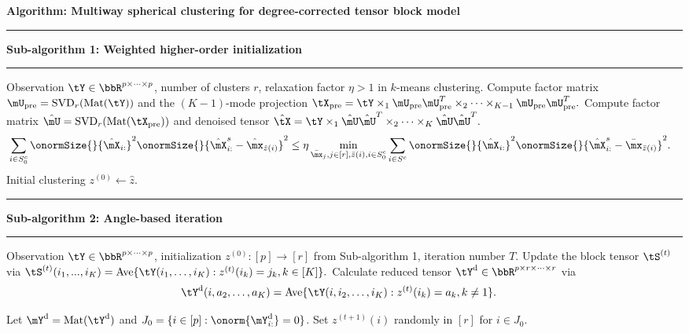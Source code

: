 \documentclass[lettersize,onecolumn,journal]{IEEEtran}
\theoremstyle{definition}
\theoremstyle{definition}
\newcommand\Algphase[1]{%
\vspace*{-.7\baselineskip}\Statex\hspace*{\dimexpr-\algorithmicindent-2pt\relax}\rule{\columnwidth}{0.4pt}%
\Statex\hspace*{-\algorithmicindent}\textbf{#1}%
\vspace*{-.7\baselineskip}\Statex\hspace*{\dimexpr-\algorithmicindent-2pt\relax}\rule{\columnwidth}{0.4pt}%
}
\begin{document}
\begin{algorithm}[h!]
\caption*{\bf Algorithm: Multiway spherical clustering for degree-corrected tensor block model }
\vspace{.15cm}
\begin{algorithmic}[1]
\Algphase{Sub-algorithm 1: Weighted higher-order initialization}
\INPUT Observation $\tY \in \bbR^{p\times \cdots \times p}$, number of clusters $r$, relaxation factor $\eta > 1$ in $k$-means clustering.
\State Compute factor matrix $ \mU_{\text{pre}} = \text{SVD}_{r} (\text{Mat}(\tY))$ and the $(K-1)$-mode projection $
\tX_{\text{pre}} = \tY \times_1   \mU_{\text{pre}} \mU_{\text{pre}}^T \times_2 \cdots \times_{K-1}  \mU_{\text{pre}} \mU_{\text{pre}}^T.$
\State Compute factor matrix $\hat \mU = \text{SVD}_{r}(\text{Mat}(\tX_{\text{pre}}))$ and denoised tensor
$\hat \tX = \tY \times_1 \hat \mU \hat \mU^T \times_2 \cdots \times_K \hat \mU \hat \mU^T.$
\begin{align}
    &\sum_{i \in S_0^c }  \onormSize{}{\hat \mX_{i:}}^2 \onormSize{}{\hat \mX_{i:}^s - \hat \mx_{\hat z(i)} }^2 
    \leq 
    \eta \min_{\substack{\bar \mx_j, j\in[r], \bar z(i),i\in S_0^{c}}} \sum_{i \in S^c } \onormSize{}{\hat \mX_{i:}}^2 \onormSize{}{ \hat \mX_{i:}^s -   \bar \mx_{\bar z(i)}}^2.
\end{align}
\OUTPUT Initial clustering $z^{(0)} \leftarrow \hat z$.

\Algphase{Sub-algorithm 2: Angle-based iteration}
\INPUT Observation $\tY \in \bbR^{p \times \cdots \times p}$, initialization $z^{(0)} \colon [p]\to[r]$ from Sub-algorithm 1, iteration number $T$.
\State Update the block tensor $\tS^{(t)}$ via
$\tS^{(t)} (i_1,...,i_K)= \text{Ave} \{\tY(i_1,\ldots,i_K): z^{(t)}(i_k) = j_k, k \in [K]\}.$
\State Calculate reduced tensor $\tY^{\text{d}} \in \bbR^{p \times r \times \cdots \times r}$ via
\begin{align}
    &\tY^{\text{d}}(i,a_2,\ldots,a_K) 
    = 
\text{Ave}\{\tY(i,i_2,\ldots,i_K): z^{(t)}(i_k) = a_k, k \neq 1 \}.
\end{align}

\State Let $\mY^{\text{d}} = \text{Mat}(\tY^{\text{d}})$ and $J_0 = \{ i\in[p]: \onorm{\mY^{\text{d}}_{i:}} = 0\}$. Set $z^{(t+1)}(i)$ randomly in $[r]$ for $i \in J_0$.


\end{algorithmic}
\end{algorithm}
\end{document}
